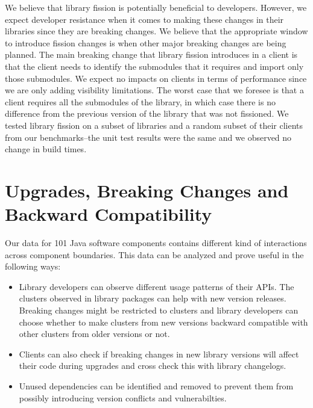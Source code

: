 We believe that library fission is potentially beneficial to developers. However, we expect developer resistance when it comes to making these changes in their libraries since they are breaking changes. We believe that the appropriate window to introduce fission changes is when other major breaking changes are being planned. The main breaking change that library fission introduces in a client is that the client needs to identify the submodules that it requires and import only those submodules. We expect no impacts on clients in terms of performance since we are only adding visibility limitations. The worst case that we foresee is that a client requires all the submodules of the library, in which case there is no difference from the previous version of the library that was not fissioned. We tested library fission on a subset of libraries and a random subset of their clients from our benchmarks--the unit test results were the same and we observed no change in build times.



\section{Upgrades, Breaking Changes and Backward Compatibility}
Our data for 101 Java software components contains different kind of interactions across component boundaries. This data can be analyzed and prove useful in the following ways:
\begin{itemize}
\item Library developers can observe different usage patterns of their APIs. The clusters observed in library packages can help with new version releases. Breaking changes might be restricted to clusters and library developers can choose whether to make clusters from new versions backward compatible with other clusters from older versions or not. 
\item Clients can also check if breaking changes in new library versions will affect their code during upgrades and cross check this with library changelogs. 
\item Unused dependencies can be identified and removed to prevent them from possibly introducing version conflicts and vulnerabilties.
\end{itemize}